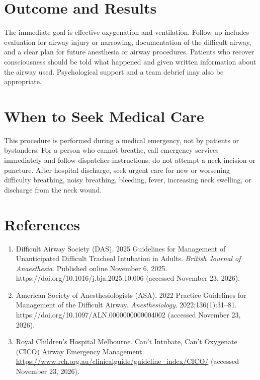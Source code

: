 \section*{Outcome and Results}
The immediate goal is effective oxygenation and ventilation. Follow-up includes evaluation for airway injury or narrowing, documentation of the difficult airway, and a clear plan for future anesthesia or airway procedures. Patients who recover consciousness should be told what happened and given written information about the airway used. Psychological support and a team debrief may also be appropriate.

\section*{When to Seek Medical Care}
This procedure is performed during a medical emergency, not by patients or bystanders. For a person who cannot breathe, call emergency services immediately and follow dispatcher instructions; do not attempt a neck incision or puncture. After hospital discharge, seek urgent care for new or worsening difficulty breathing, noisy breathing, bleeding, fever, increasing neck swelling, or discharge from the neck wound.

\section*{References}
\begin{enumerate}
  \item Difficult Airway Society (DAS). 2025 Guidelines for Management of Unanticipated Difficult Tracheal Intubation in Adults. \textit{British Journal of Anaesthesia}. Published online November 6, 2025. https://doi.org/10.1016/j.bja.2025.10.006 (accessed November 23, 2026).
  \item American Society of Anesthesiologists (ASA). 2022 Practice Guidelines for Management of the Difficult Airway. \textit{Anesthesiology}. 2022;136(1):31--81. https://doi.org/10.1097/ALN.0000000000004002 (accessed November 23, 2026).
  \item Royal Children's Hospital Melbourne. Can't Intubate, Can't Oxygenate (CICO) Airway Emergency Management. \url{https://www.rch.org.au/clinicalguide/guideline_index/CICO/} (accessed November 23, 2026).
\end{enumerate}
\clearpage

